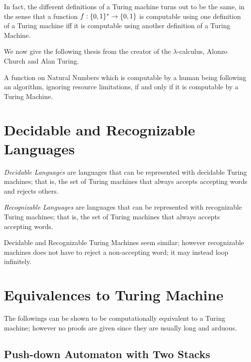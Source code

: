 \documentclass{report}
\begin{document}
		In fact, the different definitions of a Turing machine turns out to be the same, in the sense that a function $f:\{0,1\}^\ast \rightarrow \{0,1\}$ is computable using one definition of a Turing machine iff it is computable using another definition of a Turing Machine.
		
		We now give the following thesis from the creator of the $\lambda$-calculus, Alonzo Church and Alan Turing.
		\begin{thesis} \label{thm_church_turing}
			A function on Natural Numbers which is computable by a human being following an algorithm, ignoring resource limitations, if and only if it is computable by a Turing Machine.
		\end{thesis}
		
		\section{Decidable and Recognizable Languages}
		\begin{defn} \label{def_decidable_language}
			\emph{Decidable Languages} are languages that can be represented with decidable Turing machines; that is, the set of Turing machines that always accepts accepting words and rejects others.
		\end{defn}
	
		\begin{defn} \label{def_recognizable_language}
			\emph{Recognizable Languages} are languages that can be represented with recognizable Turing machines; that is, the set of Turing machines that always accepts accepting words.
		\end{defn}
		
		Decidable and Recognizable Turing Machines seem similar; however recognizable machines does not have to reject a non-accepting word; it may instead loop infinitely.
		
		\section{Equivalences to Turing Machine}
			The followings can be shown to be computationally equivalent to a Turing machine; however no proofs are given since they are usually long and arduous.
			\subsection{Push-down Automaton with Two Stacks}
			
\end{document}
